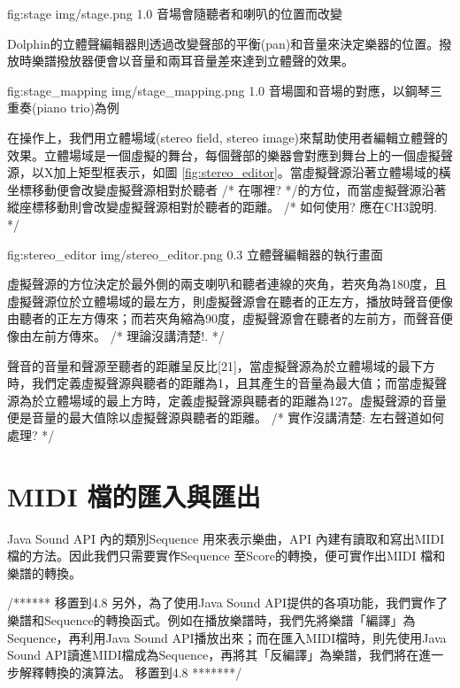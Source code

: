 \documentclass[12pt,a4paper,oneside]{report}
\begin{document}


\figurewithcaption
{fig:stage}
{img/stage.png}
{1.0}
{音場會隨聽者和喇叭的位置而改變}

Dolphin的立體聲編輯器則透過改變聲部的平衡(pan)和音量來決定樂器的位置。撥放時樂譜撥放器便會以音量和兩耳音量差來達到立體聲的效果。

\figurewithcaption
{fig:stage_mapping}
{img/stage_mapping.png}
{1.0}
{音場圖和音場的對應，以鋼琴三重奏(piano trio)為例}

在操作上，我們用立體場域(stereo field, stereo image)來幫助使用者編輯立體聲的效果。立體場域是一個虛擬的舞台，每個聲部的樂器會對應到舞台上的一個虛擬聲源，以X加上矩型框表示，如圖 \ref{fig:stereo_editor}。當虛擬聲源沿著立體場域的橫坐標移動便會改變虛擬聲源相對於聽者 /* 在哪裡?  */的方位，而當虛擬聲源沿著縱座標移動則會改變虛擬聲源相對於聽者的距離。  /* 如何使用? 應在CH3說明. */


\figurewithcaption
{fig:stereo_editor}
{img/stereo_editor.png}
{0.3}
{立體聲編輯器的執行畫面}


虛擬聲源的方位決定於最外側的兩支喇叭和聽者連線的夾角，若夾角為180度，且虛擬聲源位於立體場域的最左方，則虛擬聲源會在聽者的正左方，播放時聲音便像由聽者的正左方傳來；而若夾角縮為90度，虛擬聲源會在聽者的左前方，而聲音便像由左前方傳來。  /*
理論沒講清楚!.
*/

聲音的音量和聲源至聽者的距離呈反比[21]，當虛擬聲源為於立體場域的最下方時，我們定義虛擬聲源與聽者的距離為1，且其產生的音量為最大值；而當虛擬聲源為於立體場域的最上方時，定義虛擬聲源與聽者的距離為127。虛擬聲源的音量便是音量的最大值除以虛擬聲源與聽者的距離。 /*
實作沒講清楚: 左右聲道如何處理?
*/

\section{MIDI 檔的匯入與匯出}

Java Sound API 內的類別Sequence 用來表示樂曲，API 內建有讀取和寫出MIDI檔的方法。因此我們只需要實作Sequence 至Score的轉換，便可實作出MIDI 檔和樂譜的轉換。

/******  移置到4.8  
另外，為了使用Java Sound API提供的各項功能，我們實作了樂譜和Sequence的轉換函式。例如在播放樂譜時，我們先將樂譜「編譯」為Sequence，再利用Java Sound API播放出來；而在匯入MIDI檔時，則先使用Java Sound API讀進MIDI檔成為Sequence，再將其「反編譯」為樂譜，我們將在進一步解釋轉換的演算法。
移置到4.8  *******/
\end{document}
